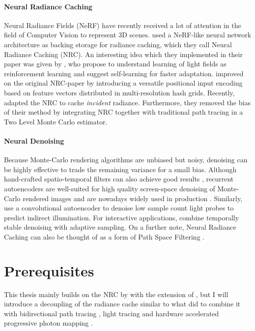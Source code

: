 \paragraph{Neural Radiance Caching}
Neural Radiance Fields (NeRF) \parencite{mildenhall2020} have recently received a lot of attention in the field of Computer Vision to represent 3D scenes.
\textcite{muller2021} used a NeRF-like neural network architecture as backing storage for radiance caching, which they call Neural Radiance Caching (NRC).
An interesting idea which they implemented in their paper was given by \textcite{dahm2017}, who propose to understand learning of light fields as reinforcement learning and suggest self-learning for faster adaptation.
\textcite{muller2022} improved on the original NRC-paper by introducing a versatile positional input encoding based on feature vectors distributed in multi-resolution hash grids.
Recently, \textcite{dereviannykh2024} adapted the NRC to cache \emph{incident} radiance.
Furthermore, they removed the bias of their method by integrating NRC together with traditional path tracing in a Two Level Monte Carlo estimator.

\paragraph{Neural Denoising}
Because Monte-Carlo rendering algorithms are unbiased but noisy, denoising can be highly effective to trade the remaining variance for a small bias.
Although hand-crafted spatio-temporal filters can also achieve good results \parencite{schied2017}, recurrent autoencoders are well-suited for high quality screen-space denoising of Monte-Carlo rendered images \parencite{chaitanya2017} and are nowadays widely used in production \parencite{afra2019}.
Similarly, \textcite{jiang2020} use a convolutional autoencoder to denoise low sample count light probes to predict indirect illumination.
For interactive applications, \textcite{hasselgren2020} combine temporally stable denoising with adaptive sampling.
On a further note, Neural Radiance Caching \parencite{muller2021} can also be thought of as a form of Path Space Filtering \parencite{keller2016}.

\section{Prerequisites}
This thesis mainly builds on the NRC by \textcite{muller2021} with the extension of \textcite{muller2022}, but I will introduce a decoupling of the radiance cache similar to what \textcite{walter1999,tole2002} did to combine it with bidirectional path tracing \parencite{veach1997}, light tracing \parencite{arvo1986} and hardware accelerated progressive photon mapping \parencite{jensen1996,kern2023,hachisuka2008}.
